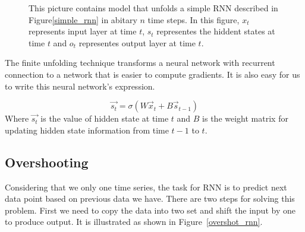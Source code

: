 \documentclass[officiallayout]{tktla}
\begin{document}
\begin{figure}[h!]
  \caption{This picture contains model that unfolds a simple RNN described in Figure\ref{simple_rnn} in abitary $n$ time steps. In this figure, $x_t$ represents input layer at time $t$, $s_t$ representes the hiddent states at time $t$ and $o_t$ representes output layer at time $t$.}\label{unfolded_simple_rnn}
\end{figure}

The finite unfolding technique transforms a neural network with recurrent connection to a network that is easier to compute gradients. It is also easy for us to write this neural network's expression.

\begin{equation}
\vec{s_{t}} = \sigma(W\vec{x}_t + B\vec{s}_{t-1})\label{internal_state_fomula}
\end{equation}
Where $\vec{s_t}$ is the value of hidden state at time $t$ and $B$ is the weight matrix for updating hidden state information from time $t-1$ to $t$.


\subsection{Overshooting}
Considering that we only one time series, the task for RNN is to predict next data point based on previous data we have. There are two steps for solving this problem. First we need to copy the data into two set and shift the input by one to produce output. It is illustrated as shown in Figure~\ref{overshot_rnn}.
\end{document}
